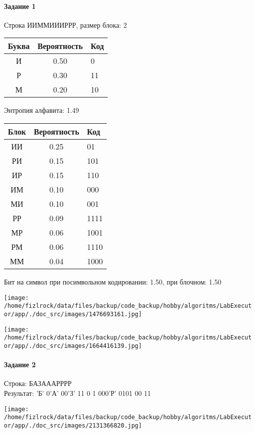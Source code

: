 \documentclass[a4paper, 12pt]{article}
\begin{document}
\paragraph{Задание 1}

Строка ИИММИИИРРР, размер блока: 2
\begin{center}
 \begin{tabular}{ |c|c|l| } 
  \hline
     Буква & Вероятность & Код\\ \hline
И & 0.50 & 0\\\hline
Р & 0.30 & 11\\\hline
М & 0.20 & 10
\\ \hline \end{tabular}
\end{center}
Энтропия алфавита: 1.49
\begin{center}
 \begin{tabular}{ |c|c|l| } 
  \hline
     Блок & Вероятность & Код\\ \hline
ИИ & 0.25 & 01\\\hline
РИ & 0.15 & 101\\\hline
ИР & 0.15 & 110\\\hline
ИМ & 0.10 & 000\\\hline
МИ & 0.10 & 001\\\hline
РР & 0.09 & 1111\\\hline
МР & 0.06 & 1001\\\hline
РМ & 0.06 & 1110\\\hline
ММ & 0.04 & 1000
\\ \hline \end{tabular}
\end{center}
Бит на символ при посимвольном кодировании: 1.50, при блочном: 1.50

\texttt{[image: /home/fizlrock/data/files/backup/code\_backup/hobby/algoritms/LabExecutor/app/./doc\_src/images/1476693161.jpg]}

\texttt{[image: /home/fizlrock/data/files/backup/code\_backup/hobby/algoritms/LabExecutor/app/./doc\_src/images/1664416139.jpg]}
\pagebreak
\paragraph{Задание 2}

Строка: 
БАЗАААРРРР\\
Результат: 'Б' 0'А' 00'З' 11 0 1 000'Р' 0101 00 11

\texttt{[image: /home/fizlrock/data/files/backup/code\_backup/hobby/algoritms/LabExecutor/app/./doc\_src/images/2131366820.jpg]}
\end{document}
